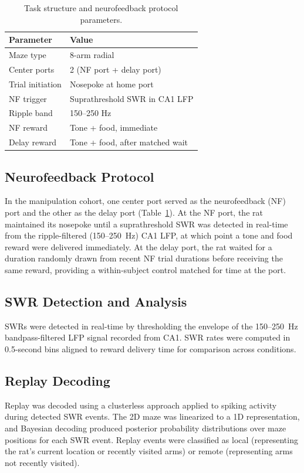 \documentclass[11pt]{article}
\begin{document}
\begin{table}[ht]
\centering
\caption{Task structure and neurofeedback protocol parameters.}
\label{tab:protocol}
\begin{tabular}{ll}
\toprule
Parameter & Value \\
\midrule
Maze type & 8-arm radial \\
Center ports & 2 (NF port + delay port) \\
Trial initiation & Nosepoke at home port \\
NF trigger & Suprathreshold SWR in CA1 LFP \\
Ripple band & 150--250 Hz \\
NF reward & Tone + food, immediate \\
Delay reward & Tone + food, after matched wait \\
\bottomrule
\end{tabular}
\end{table}

\subsection{Neurofeedback Protocol}

In the manipulation cohort, one center port served as the neurofeedback (NF) port and the other as the delay port (Table~\ref{tab:protocol}). At the NF port, the rat maintained its nosepoke until a suprathreshold SWR was detected in real-time from the ripple-filtered (150--250~Hz) CA1 LFP, at which point a tone and food reward were delivered immediately. At the delay port, the rat waited for a duration randomly drawn from recent NF trial durations before receiving the same reward, providing a within-subject control matched for time at the port.

\subsection{SWR Detection and Analysis}

SWRs were detected in real-time by thresholding the envelope of the 150--250~Hz bandpass-filtered LFP signal recorded from CA1. SWR rates were computed in 0.5-second bins aligned to reward delivery time for comparison across conditions.

\subsection{Replay Decoding}

Replay was decoded using a clusterless approach \citep{denovellis2021} applied to spiking activity during detected SWR events. The 2D maze was linearized to a 1D representation, and Bayesian decoding produced posterior probability distributions over maze positions for each SWR event. Replay events were classified as local (representing the rat's current location or recently visited arms) or remote (representing arms not recently visited).
\end{document}
